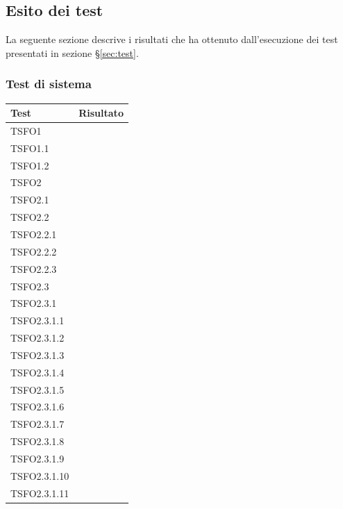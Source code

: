 \subsection{Esito dei test}
\label{esitotest}
	La seguente sezione descrive i risultati che \GroupName{} ha ottenuto 
	dall'esecuzione dei test presentati in sezione §\ref{sec:test}. 
\subsubsection{Test di sistema} \label{esitoSistema}

	\TestLegend{}
			\begin{center}
   			\begin{longtable}{ | >{\centering\arraybackslash}m{5cm} | >{\centering\arraybackslash}m{5cm} | }
        
        	\hline
        		\textbf{Test} & \textbf{Risultato} \\ \hline
        	\endhead				
				TSFO1 & \done{} \\ \hline   		
				TSFO1.1	& \done{} \\ \hline	
				TSFO1.2 & \done{} \\ \hline	
				TSFO2 & \done{} \\ \hline
				TSFO2.1 & \done{} \\ \hline
				TSFO2.2 & \done{} \\ \hline
				TSFO2.2.1 & \done{} \\ \hline
				TSFO2.2.2 & \done{} \\ \hline
				TSFO2.2.3 & \done{} \\ \hline
				TSFO2.3 & \done{} \\ \hline
				TSFO2.3.1 & \done{} \\ \hline
				TSFO2.3.1.1 & \done{} \\ \hline
				TSFO2.3.1.2 & \done{} \\ \hline
				TSFO2.3.1.3 & \done{} \\ \hline
				TSFO2.3.1.4 & \done{} \\ \hline
				TSFO2.3.1.5 & \done{} \\ \hline
				TSFO2.3.1.6 & \done{} \\ \hline
				TSFO2.3.1.7 & \done{} \\ \hline
				TSFO2.3.1.8 & \done{} \\ \hline
				TSFO2.3.1.9 & \done{} \\ \hline
				TSFO2.3.1.10 & \done{} \\ \hline
				TSFO2.3.1.11 & \done{} \\ \hline

\end{longtable}
\end{center}
